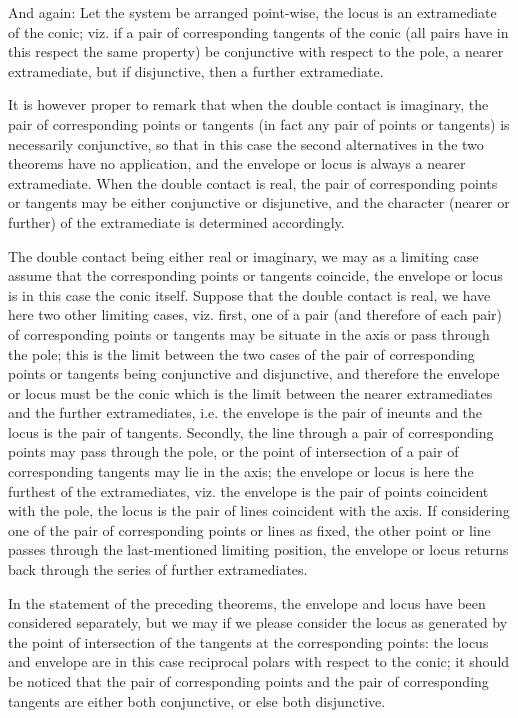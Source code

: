 \documentclass[11pt,a4paper]{article}
\theoremstyle{plain}
\begin{document}
And again: Let the system be arranged point-wise, the locus is an extramediate of the conic; viz. if a pair of corresponding tangents of the conic (all pairs have in this respect the same property) be conjunctive with respect to the pole, a nearer extramediate, but if disjunctive, then a further extramediate.

It is however proper to remark that when the double contact is imaginary, the pair of corresponding points or tangents (in fact any pair of points or tangents) is necessarily conjunctive, so that in this case the second alternatives in the two theorems have no application, and the envelope or locus is always a nearer extramediate. When the double contact is real, the pair of corresponding points or tangents may be either conjunctive or disjunctive, and the character (nearer or further) of the extramediate is determined accordingly.

The double contact being either real or imaginary, we may as a limiting case assume that the corresponding points or tangents coincide, the envelope or locus is in this case the conic itself. Suppose that the double contact is real, we have here two other limiting cases, viz. first, one of a pair (and therefore of each pair) of corresponding points or tangents may be situate in the axis or pass through the pole; this is the limit between the two cases of the pair of corresponding points or tangents being conjunctive and disjunctive, and therefore the envelope or locus must be the conic which is the limit between the nearer extramediates and the further extramediates, i.e. the envelope is the pair of ineunts and the locus is the pair of tangents. Secondly, the line through a pair of corresponding points may pass through the pole, or the point of intersection of a pair of corresponding tangents may lie in the axis; the envelope or locus is here the furthest of the extramediates, viz. the envelope is the pair of points coincident with the pole, the locus is the pair of lines coincident with the axis. If considering one of the pair of corresponding points or lines as fixed, the other point or line passes through the last-mentioned limiting position, the envelope or locus returns back through the series of further extramediates.

In the statement of the preceding theorems, the envelope and locus have been considered separately, but we may if we please consider the locus as generated by the point of intersection of the tangents at the corresponding points: the locus and envelope are in this case reciprocal polars with respect to the conic; it should be noticed that the pair of corresponding points and the pair of corresponding tangents are either both conjunctive, or else both disjunctive.
\end{document}
